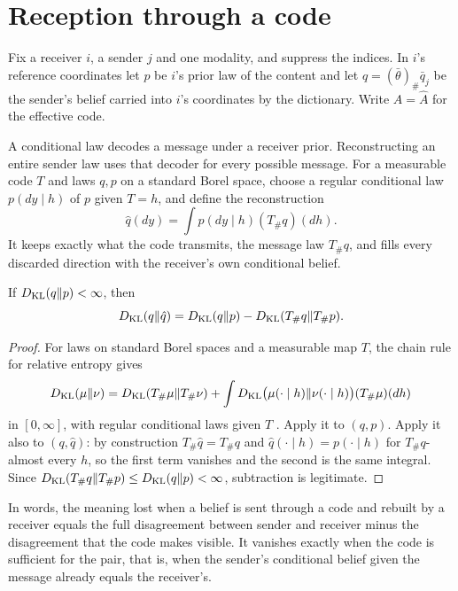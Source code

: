 \documentclass[11pt,letterpaper]{report}
\begin{document}
\chapter{Reception through a code}
\label{it1:ch-reception}

Fix a receiver $i$, a sender $j$ and one modality, and suppress the indices. In $i$'s reference coordinates let $p$ be $i$'s prior law of the content and let $q=(\bar\theta)_\#\bar q_j$ be the sender's belief carried into $i$'s coordinates by the dictionary. Write $A=\hat A$ for the effective code.

A conditional law decodes a message under a receiver prior. Reconstructing an entire sender law uses that decoder for every possible message. For a measurable code $T$ and laws $q,p$ on a standard Borel space, choose a regular conditional law $p(dy\mid h)$ of $p$ given $T=h$, and define the reconstruction
\begin{equation}
\hat q(dy)=\int p(dy\mid h)(T_\#q)(dh).
\label{it1:reconstruction}
\end{equation}
It keeps exactly what the code transmits, the message law $T_\#q$, and fills every discarded direction with the receiver's own conditional belief.

If $D_{\mathrm{KL}}(q\Vert p)<\infty$, then
\begin{equation}
D_{\mathrm{KL}}(q\Vert\hat q)=D_{\mathrm{KL}}(q\Vert p)-D_{\mathrm{KL}}(T_\#q\Vert T_\#p).
\label{it1:loss-eq}
\end{equation}
\begin{proof}
For laws on standard Borel spaces and a measurable map $T$, the chain rule for relative entropy gives
\begin{equation}
D_{\mathrm{KL}}(\mu\Vert\nu)=D_{\mathrm{KL}}(T_\#\mu\Vert T_\#\nu)+\int D_{\mathrm{KL}}\bigl(\mu(\cdot\mid h)\Vert\nu(\cdot\mid h)\bigr)(T_\#\mu)(dh)
\end{equation}
in $[0,\infty]$, with regular conditional laws given $T$ \citep{CoverThomas2006,Kallenberg2021}. Apply it to $(q,p)$. Apply it also to $(q,\hat q)$: by construction $T_\#\hat q=T_\#q$ and $\hat q(\cdot\mid h)=p(\cdot\mid h)$ for $T_\#q$-almost every $h$, so the first term vanishes and the second is the same integral. Since $D_{\mathrm{KL}}(T_\#q\Vert T_\#p)\leq D_{\mathrm{KL}}(q\Vert p)<\infty$, subtraction is legitimate.
\end{proof}

In words, the meaning lost when a belief is sent through a code and rebuilt by a receiver equals the full disagreement between sender and receiver minus the disagreement that the code makes visible. It vanishes exactly when the code is sufficient for the pair, that is, when the sender's conditional belief given the message already equals the receiver's.
\end{document}
